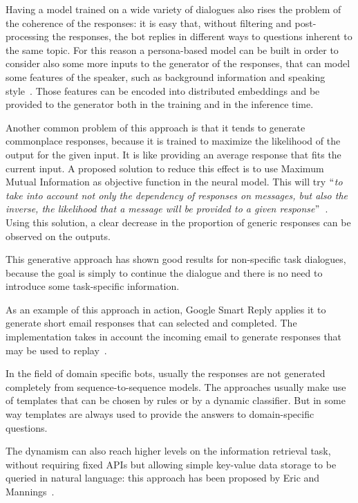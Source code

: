 Having a model trained on a wide variety of dialogues also rises the problem of the coherence of the responses: it is easy that, without filtering and post-processing the responses, the bot replies in different ways to questions inherent to the same topic. For this reason a persona-based model can be built in order to consider also some more inputs to the generator of the responses, that can model some features of the speaker, such as background information and speaking style~\cite{li2016persona}. Those features can be encoded into distributed embeddings and be provided to the generator both in the training and in the inference time.

Another common problem of this approach is that it tends to generate commonplace responses, because it is trained to maximize the likelihood of the output for the given input. It is like providing an average response that fits the current input. A proposed solution to reduce this effect is to use Maximum Mutual Information as objective function in the neural model. This will try $``$\textit{to take into account not only the dependency of responses on messages, but also the inverse, the likelihood that a message will be provided to a given response}$"$~\cite{li2015diversity}. Using this solution, a clear decrease in the proportion of generic responses can be observed on the outputs.

This generative approach has shown good results for non-specific task dialogues, because the goal is simply to continue the dialogue and there is no need to introduce some task-specific information.

As an example of this approach in action, Google Smart Reply applies it to generate short email responses that can selected and completed. The implementation takes in account the incoming email to generate responses that may be used to replay~\cite{kannan2016smart}.

In the field of domain specific bots, usually the responses are not generated completely from sequence-to-sequence models. The approaches usually make use of templates that can be chosen by rules or by a dynamic classifier. But in some way templates are always used to provide the answers to domain-specific questions.

The dynamism can also reach higher levels on the information retrieval task, without requiring fixed APIs but allowing simple key-value data storage to be queried in natural language: this approach has been proposed by Eric and Mannings~\cite{eric2017key}.

